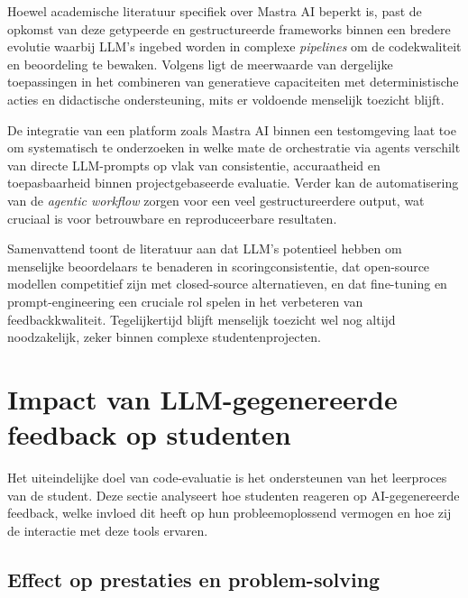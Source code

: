\vspace{1em}

Hoewel academische literatuur specifiek over Mastra AI beperkt is, past de opkomst van deze getypeerde en gestructureerde frameworks binnen een bredere evolutie waarbij LLM's ingebed worden in complexe \textit{pipelines} om de codekwaliteit en beoordeling te bewaken. Volgens \textcite{Kasneci2023} ligt de meerwaarde van dergelijke toepassingen in het combineren van generatieve capaciteiten met deterministische acties en didactische ondersteuning, mits er voldoende menselijk toezicht blijft.

\vspace{1em}

De integratie van een platform zoals Mastra AI binnen een testomgeving laat toe om systematisch te onderzoeken in welke mate de orchestratie via agents verschilt van directe LLM-prompts op vlak van consistentie, accuraatheid en toepasbaarheid binnen projectgebaseerde evaluatie. Verder kan de automatisering van de \textit{agentic workflow} zorgen voor een veel gestructureerdere output, wat cruciaal is voor betrouwbare en reproduceerbare resultaten.

\vspace{1em}

Samenvattend toont de literatuur aan dat LLM’s potentieel hebben om menselijke beoordelaars te benaderen in scoringconsistentie, dat open-source modellen competitief zijn met closed-source alternatieven, en dat fine-tuning en prompt-engineering een cruciale rol spelen in het verbeteren van feedbackkwaliteit. Tegelijkertijd blijft menselijk toezicht wel nog altijd noodzakelijk, zeker binnen complexe studentenprojecten.


\section{Impact van LLM-gegenereerde feedback op studenten}
\label{ch:impact-op-studenten}

Het uiteindelijke doel van code-evaluatie is het ondersteunen van het leerproces van de student. Deze sectie analyseert hoe studenten reageren op AI-gegenereerde feedback, welke invloed dit heeft op hun probleemoplossend vermogen en hoe zij de interactie met deze tools ervaren.

\subsection{Effect op prestaties en problem-solving}

